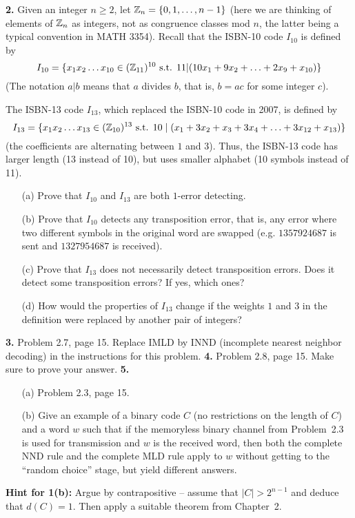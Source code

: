 \documentclass[12pt]{amsart}
\begin{document}
{\bf 2.} Given an integer $n\geq 2$, let ${\mathbb Z}_{n}=\{0,1,\ldots, n-1\}$ (here we are thinking of elements of ${\mathbb Z}_{n}$ as integers, not as congruence classes mod $n$, the latter being a typical convention in MATH 3354). Recall that the ISBN-10 code $I_{10}$ is defined by
$$I_{10}=\{x_1x_2\ldots x_{10}\in ({\mathbb Z}_{11})^{10}\mbox{ s.t. } 11 | (10x_1+9x_2+\ldots+2x_9+x_{10})\}$$
(The notation $a | b$ means that $a$ divides $b$, that is, $b=ac$ for some integer $c$).

The ISBN-13 code $I_{13}$, which replaced the ISBN-10 code in 2007, is defined by
$$I_{13}=\{x_1x_2\ldots x_{13}\in ({\mathbb Z}_{10})^{13}\mbox{ s.t. } 10\mid (x_1+3x_2+x_3+3x_4+\ldots+3x_{12}+x_{13})\}$$
(the coefficients are alternating between $1$ and $3$). Thus, the ISBN-13 code has larger length (13 instead of 10), but uses smaller alphabet (10 symbols instead of 11).
\begin{itemize}
\item[(a)] Prove that $I_{10}$ and $I_{13}$ are both $1$-error detecting.
\item[(b)] Prove that $I_{10}$ detects any transposition error, that is, any error where two different symbols in the original word are swapped (e.g.
$1357924687$ is sent and $1327954687$ is received).
\item[(c)] Prove that $I_{13}$ does not necessarily detect transposition errors. Does it detect some transposition errors? If yes, which ones?
\item[(d)] How would the properties of $I_{13}$ change if the weights $1$ and $3$ in the definition were replaced by another pair of integers?
 \end{itemize}
\skv

{\bf 3.} Problem 2.7, page 15. Replace IMLD by INND (incomplete nearest neighbor decoding) in the instructions for this problem.
\skv
{\bf 4.} Problem 2.8, page 15. Make sure to prove your answer.
\skv
{\bf 5.}
\begin{itemize} 
\item[(a)] Problem 2.3, page 15.
\item[(b)] Give an example of a binary code $C$ (no restrictions on the length of $C$) and a word $w$ such that if the memoryless binary channel from Problem~2.3 is used for transmission and $w$ is the received word, 
then both the complete NND rule and the complete MLD rule apply to $w$ without getting to the ``random choice'' stage, but yield different answers. 
\end{itemize}
\newpage
{\bf Hint for 1(b):} Argue by contrapositive -- assume that $|C|>2^{n-1}$ and deduce that $d(C)=1$. Then apply a suitable theorem from Chapter~2.
\end{document}
